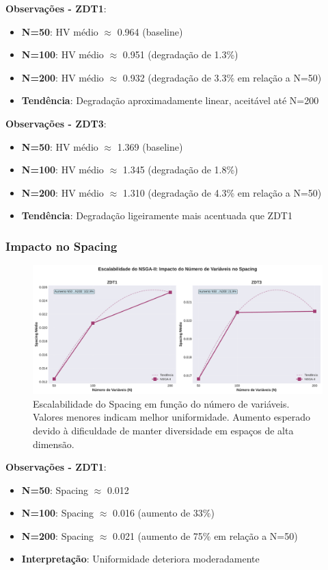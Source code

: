 \textbf{Observações - ZDT1}:
\begin{itemize}
    \item \textbf{N=50}: HV médio $\approx$ 0.964 (baseline)
    \item \textbf{N=100}: HV médio $\approx$ 0.951 (degradação de 1.3\%)
    \item \textbf{N=200}: HV médio $\approx$ 0.932 (degradação de 3.3\% em relação a N=50)
    \item \textbf{Tendência}: Degradação aproximadamente linear, aceitável até N=200
\end{itemize}

\textbf{Observações - ZDT3}:
\begin{itemize}
    \item \textbf{N=50}: HV médio $\approx$ 1.369 (baseline)
    \item \textbf{N=100}: HV médio $\approx$ 1.345 (degradação de 1.8\%)
    \item \textbf{N=200}: HV médio $\approx$ 1.310 (degradação de 4.3\% em relação a N=50)
    \item \textbf{Tendência}: Degradação ligeiramente mais acentuada que ZDT1
\end{itemize}

\subsubsection{Impacto no Spacing}

\begin{figure}[H]
    \centering
    \includegraphics[width=\textwidth]{../plots/J_spacing_nvar_scaling.pdf}
    \caption{Escalabilidade do Spacing em função do número de variáveis. Valores menores indicam melhor uniformidade. Aumento esperado devido à dificuldade de manter diversidade em espaços de alta dimensão.}
    \label{fig:sp_nvar_scaling}
\end{figure}

\textbf{Observações - ZDT1}:
\begin{itemize}
    \item \textbf{N=50}: Spacing $\approx$ 0.012
    \item \textbf{N=100}: Spacing $\approx$ 0.016 (aumento de 33\%)
    \item \textbf{N=200}: Spacing $\approx$ 0.021 (aumento de 75\% em relação a N=50)
    \item \textbf{Interpretação}: Uniformidade deteriora moderadamente
\end{itemize}

